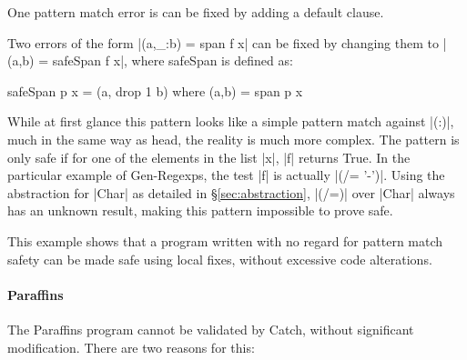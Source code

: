 \documentclass[preprint]{sigplanconf}
\newcommand{\C}[1]{\textsf{#1}}
\begin{document}
One pattern match error is can be fixed by adding a default clause.

Two errors of the form |(a,_:b) = span f x| can be fixed by changing them to |(a,b) = safeSpan f x|, where \C{safeSpan} is defined as:

\begin{code}
safeSpan p x = (a, drop 1 b)
    where (a,b) = span p x
\end{code}

While at first glance this pattern looks like a simple pattern match against |(:)|, much in the same way as \C{head}, the reality is much more complex. The pattern is only safe if for one of the elements in the list |x|, |f| returns True. In the particular example of Gen-Regexps, the test |f| is actually |(/= '-')|. Using the abstraction for |Char| as detailed in \S\ref{sec:abstraction}, |(/=)| over |Char| always has an unknown result, making this pattern impossible to prove safe.

This example shows that a program written with no regard for pattern match safety can be made safe using local fixes, without excessive code alterations.

\paragraph{Paraffins}

The Paraffins program cannot be validated by Catch, without significant modification. There are two reasons for this:
\end{document}
